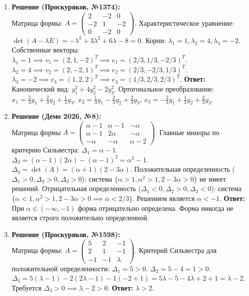 \begin{enumerate}
    \item \textbf{Решение (Проскуряков, №1374):}\\
    Матрица формы: $A = \begin{pmatrix} 2 & -2 & 0 \\ -2 & 1 & -2 \\ 0 & -2 & 0 \end{pmatrix}$.
    Характеристическое уравнение: $\det(A - \lambda E) = -\lambda^3 + 3\lambda^2 + 6\lambda - 8 = 0$. Корни: $\lambda_1 = 1, \lambda_2 = 4, \lambda_3 = -2$.
    Собственные векторы:
    $\lambda_1=1 \implies v_1 = (2, 1, -2)^T \implies e_1 = (2/3, 1/3, -2/3)^T$.
    $\lambda_2=4 \implies v_2 = (2, -2, 1)^T \implies e_2 = (2/3, -2/3, 1/3)^T$.
    $\lambda_3=-2 \implies v_3 = (1, 2, 2)^T \implies e_3 = (1/3, 2/3, 2/3)^T$.
    \textbf{Ответ:} Канонический вид: $y_1^2 + 4y_2^2 - 2y_3^2$. 
    Ортогональное преобразование: $x_1 = \frac{2}{3}y_1 + \frac{2}{3}y_2 + \frac{1}{3}y_3$, $x_2 = \frac{1}{3}y_1 - \frac{2}{3}y_2 + \frac{2}{3}y_3$, $x_3 = -\frac{2}{3}y_1 + \frac{1}{3}y_2 + \frac{2}{3}y_3$.

    \item \textbf{Решение (Демо 2026, №8):}\\
    Матрица формы $A = \begin{pmatrix} \alpha-1 & \alpha-1 & -\alpha \\ \alpha-1 & 2\alpha & -\alpha \\ -\alpha & -\alpha & \alpha-2 \end{pmatrix}$.
    Главные миноры по критерию Сильвестра:
    $\Delta_1 = \alpha - 1$.
    $\Delta_2 = (\alpha-1)(2\alpha) - (\alpha-1)^2 = \alpha^2 - 1$.
    $\Delta_3 = \det(A) = (\alpha+1)(2 - 3\alpha)$.
    Положительная определенность ($\Delta_1>0, \Delta_2>0, \Delta_3>0$): система $\{\alpha>1, \alpha^2>1, 2-3\alpha>0\}$ не имеет решений.
    Отрицательная определенность ($\Delta_1<0, \Delta_2>0, \Delta_3<0$): система $\{\alpha<1, \alpha^2>1, 2-3\alpha>0 \implies \alpha<2/3\}$. Решением является $\alpha < -1$.
    \textbf{Ответ:} При $\alpha \in (-\infty, -1)$ форма отрицательно определена. Форма никогда не является строго положительно определенной.

    \item \textbf{Решение (Проскуряков, №1598):}\\
    Матрица формы: $A = \begin{pmatrix} 5 & 2 & -1 \\ 2 & 1 & -1 \\ -1 & -1 & \lambda \end{pmatrix}$.
    Критерий Сильвестра для положительной определенности:
    $\Delta_1 = 5 > 0$.
    $\Delta_2 = 5 - 4 = 1 > 0$.
    $\Delta_3 = 5(\lambda - 1) - 2(2\lambda - 1) - 1(-2 + 1) = 5\lambda - 5 - 4\lambda + 2 + 1 = \lambda - 2$.
    Требуется $\Delta_3 > 0 \implies \lambda - 2 > 0$.
    \textbf{Ответ:} $\lambda > 2$.


\end{enumerate}
